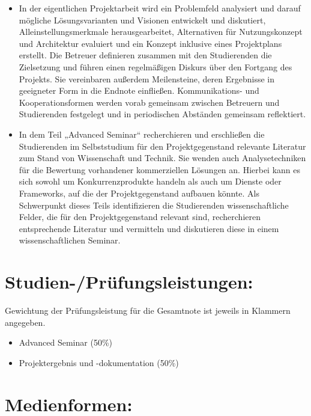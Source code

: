 \begin{itemize}
\tightlist
\item
  In der eigentlichen Projektarbeit wird ein Problemfeld analysiert und
  darauf mögliche Lösungsvarianten und Visionen entwickelt und
  diskutiert, Alleinstellungsmerkmale herausgearbeitet, Alternativen für
  Nutzungskonzept und Architektur evaluiert und ein Konzept inklusive
  eines Projektplans erstellt. Die Betreuer definieren zusammen mit den
  Studierenden die Zielsetzung und führen einen regelmäßigen Diskurs
  über den Fortgang des Projekts. Sie vereinbaren außerdem Meilensteine,
  deren Ergebnisse in geeigneter Form in die Endnote einfließen.
  Kommunikations- und Kooperationsformen werden vorab gemeinsam zwischen
  Betreuern und Studierenden festgelegt und in periodischen Abständen
  gemeinsam reflektiert.
\item
  In dem Teil „Advanced Seminar`` recherchieren und erschließen die
  Studierenden im Selbststudium für den Projektgegenstand relevante
  Literatur zum Stand von Wissenschaft und Technik. Sie wenden auch
  Analysetechniken für die Bewertung vorhandener kommerziellen Lösungen
  an. Hierbei kann es sich sowohl um Konkurrenzprodukte handeln als auch
  um Dienste oder Frameworks, auf die der Projektgegenstand aufbauen
  könnte. Als Schwerpunkt dieses Teils identifizieren die Studierenden
  wissenschaftliche Felder, die für den Projektgegenstand relevant sind,
  recherchieren entsprechende Literatur und vermitteln und diskutieren
  diese in einem wissenschaftlichen Seminar.
\end{itemize}

\section*{Studien-/Prüfungsleistungen:\label{/mi-2017/modulbeschreibungen-master/MA_Modul_Projekt_Vision&Konzept}}\label{studien-pruxfcfungsleistungenpathlabelmi-2017modulbeschreibungen-mastermaux5fmodulux5fprojektux5fvisionkonzept}

Gewichtung der Prüfungsleistung für die Gesamtnote ist jeweils in
Klammern angegeben.

\begin{itemize}
\tightlist
\item
  Advanced Seminar (50\%)
\item
  Projektergebnis und -dokumentation (50\%)
\end{itemize}

\section*{Medienformen:\label{/mi-2017/modulbeschreibungen-master/MA_Modul_Projekt_Vision&Konzept}}\label{medienformenpathlabelmi-2017modulbeschreibungen-mastermaux5fmodulux5fprojektux5fvisionkonzept}

